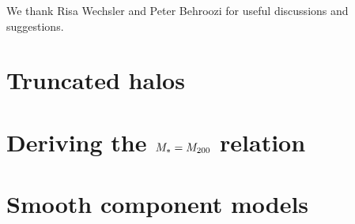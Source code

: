 \documentclass[useAMS,usenatbib]{mn2e}
\begin{document}
We thank Risa Wechsler and Peter Behroozi for useful discussions and 
suggestions.



\appendix

\section{Truncated \LCDM halos}
\label{appendix:halos}

\section{Deriving the $M_{*}=M_{\rm 200}$ relation}
\label{appendix:MSMH}

\section{Smooth component models}
\label{appendix:smooth}





% 





\label{lastpage}
\bsp
\end{document}
